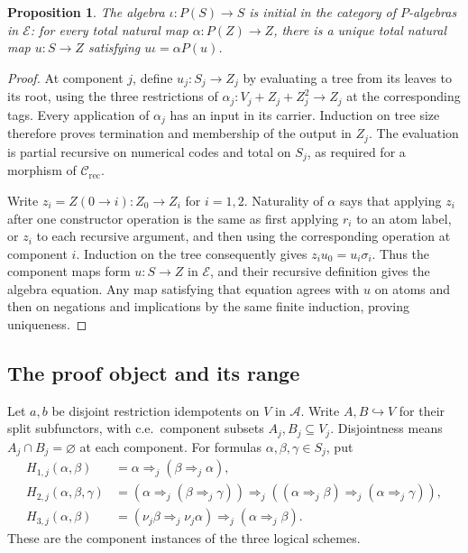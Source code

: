 \documentclass[11pt]{article}
\newtheorem{proposition}[theorem]{Proposition}
\begin{document}
\begin{proposition}\label{prop:fork-syntax-initial}
The algebra $\iota:P(S)\to S$ is initial in the category of
$P$-algebras in $\mathcal E$: for every total natural map
$\alpha:P(Z)\to Z$, there is a unique total natural map
$u:S\to Z$ satisfying $u\iota=\alpha P(u)$.
\end{proposition}
\begin{proof}
At component $j$, define $u_j:S_j\to Z_j$ by evaluating a tree
from its leaves to its root, using the three restrictions of
$\alpha_j:V_j+Z_j+Z_j^2\to Z_j$ at the corresponding tags.
Every application of $\alpha_j$ has an input in its carrier.
Induction on tree size therefore proves termination and membership
of the output in $Z_j$. The evaluation is partial recursive on
numerical codes and total on $S_j$, as required for a morphism of
$\mathcal C_{\mathrm{rec}}$.

Write $z_i=Z(0\to i):Z_0\to Z_i$ for $i=1,2$. Naturality of
$\alpha$ says that applying $z_i$ after one constructor operation
is the same as first applying $r_i$ to an atom label, or $z_i$
to each recursive argument, and then using the corresponding
operation at component $i$. Induction on the tree consequently
gives $z_i u_0=u_i\sigma_i$. Thus the component maps form
$u:S\to Z$ in $\mathcal E$, and their recursive definition gives
the algebra equation. Any map satisfying that equation agrees
with $u$ on atoms and then on negations and implications by the
same finite induction, proving uniqueness.
\end{proof}

\subsection{The proof object and its range}

Let $a,b$ be disjoint restriction idempotents on $V$ in $\mathcal A$.
Write $A,B\hookrightarrow V$ for their split subfunctors, with
c.e.\ component subsets $A_j,B_j\subseteq V_j$. Disjointness
means $A_j\cap B_j=\varnothing$ at each component.
For formulas $\alpha,\beta,\gamma\in S_j$, put
\begin{align*}
 H_{1,j}(\alpha,\beta)
   &=\alpha\Rightarrow_j(\beta\Rightarrow_j\alpha),\\
 H_{2,j}(\alpha,\beta,\gamma)
   &=(\alpha\Rightarrow_j(\beta\Rightarrow_j\gamma))
     \Rightarrow_j((\alpha\Rightarrow_j\beta)
                          \Rightarrow_j(\alpha\Rightarrow_j\gamma)),\\
 H_{3,j}(\alpha,\beta)
   &=(\nu_j\beta\Rightarrow_j\nu_j\alpha)
                          \Rightarrow_j(\alpha\Rightarrow_j\beta).
\end{align*}
These are the component instances of the three logical schemes.
\end{document}
